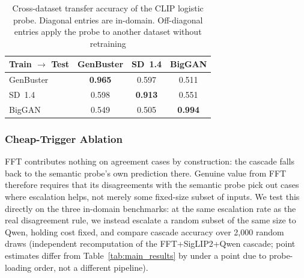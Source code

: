 \documentclass{ieeeaccess}
\begin{document}
\begin{table}[h]
\centering
\caption{Cross-dataset transfer accuracy of the CLIP logistic probe. Diagonal entries
are in-domain. Off-diagonal entries apply the probe to another dataset without
retraining}

\label{tab:clip_transfer}
\begin{tabular}{lccc}
\toprule
Train $\rightarrow$ Test & GenBuster & SD~1.4 & BigGAN \\
\midrule
GenBuster & \textbf{0.965} & 0.597 & 0.511 \\
SD~1.4    & 0.598 & \textbf{0.913} & 0.551 \\
BigGAN    & 0.549 & 0.505 & \textbf{0.994} \\
\bottomrule
\end{tabular}
\end{table}

\subsubsection{Cheap-Trigger Ablation}

FFT contributes nothing on agreement cases by construction: the cascade falls back to
the semantic probe's own prediction there. Genuine value from FFT therefore requires
that its disagreements with the semantic probe pick out cases where escalation helps,
not merely some fixed-size subset of inputs. We test this directly on the three
in-domain benchmarks: at the same escalation rate as the real disagreement rule, we
instead escalate a random subset of the same size to Qwen, holding cost fixed, and
compare cascade accuracy over 2{,}000 random draws (independent recomputation of the
FFT+SigLIP2+Qwen cascade; point estimates differ from Table~\ref{tab:main_results} by
under a point due to probe-loading order, not a different pipeline).
\end{document}
